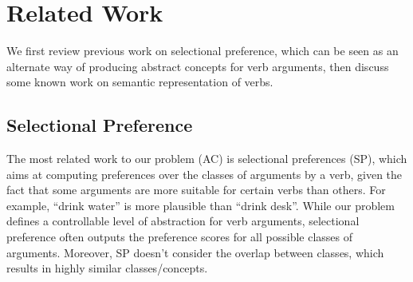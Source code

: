 \section{Related Work}
\label{sec:related}
We first review previous work on selectional preference,
which can be seen as an alternate way of
producing abstract concepts for verb arguments, then discuss
some known work on semantic representation of verbs.

\subsection{Selectional Preference}
The most related work to our problem (AC) is
selectional preferences (SP), which
aims at computing preferences over the classes of arguments by a verb,
given the fact that some arguments are more
suitable for certain verbs than others. For example,
``drink water'' is more plausible than ``drink desk''.
While our problem defines a controllable level of abstraction
for verb arguments, selectional preference
often outputs the preference scores for all possible classes of
arguments.  Moreover, SP doesn't consider the overlap between classes,
which results in highly similar classes/concepts.

